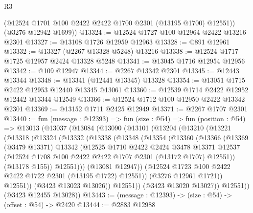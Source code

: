 \begin{lexlean}{R3}
\begin{coremodule}
        (@12524 @1701 @100 @2422 @2422 @1700 @2301 (@13195 @1700) @12551))
      (@3276 @12942 @1699))
@13324 := @12524 @1727 @100 @12964 @2422 @13216 @2301
@13327 := @13108 @1726 @12959 @12963
@13328 := @891 @12961
@13332 := @13327 (@2267 @13328 @5248) @13216
@13338 := @12524 @1717 @1725 @12957 @2424 @13328 @5248
@13341 := @13045 @1716 @12954 @12956
@13342 := @109 @12947
@13344 := @2267 @13342 @2301
@13345 := @12443 @13344
@13348 := @13341 (@12441 @13345) @13328
@13354 := @13051 @1715 @2422 @12953 @12440 @13345 @13061
@13360 := @12539 @1714 @2422 @12952 @12442 @13344 @12549
@13366 := @12524 @1712 @100 @12950 @2422 @13342 @2301
@13369 := @13152 @1711 @2425 @12949
@13371 := @2267 @1707 @2301
@13440 := fun (message : @12393) =>
  fun (size : @54) =>
  fun (position : @54) =>
  @13013
    (@13037
      (@13084
        (@13090
          (@13101
            (@13204
              (@13210
                (@13221
                  (@13318
                    (@13324
                      (@13332
                        (@13338
                          (@13348
                            (@13354
                              (@13360
                                (@13366
                                  (@13369
                                    (@3479 @13371)
                                    @13342
                                    (@12525
                                      @1710
                                      @2422
                                      @2424
                                      @3478
                                      @13371
                                      @12537
                                      (@12524
                                        @1708
                                        @100
                                        @2422
                                        @2422
                                        @1707
                                        @2301
                                        (@13172 @1707)
                                        @12551))
                                    (@13178 @155))
                                  @12551)))
                            (@13081 @12947))
                          (@12524 @1723 @100 @2422 @2422 @1722 @2301 (@13195 @1722) @12551))
                        (@3276 @12961 @1721))
                      @12551))
                  (@3423 @13023 @13026))
                @12551))
            (@3423 @13020 @13027))
          @12551))
      (@3423 @12455 @13028))
@13443 := (message : @12393) -> (size : @54) -> (offset : @54) -> @2420
@13444 := @2883 @12988

\end{coremodule}
\end{lexlean}
